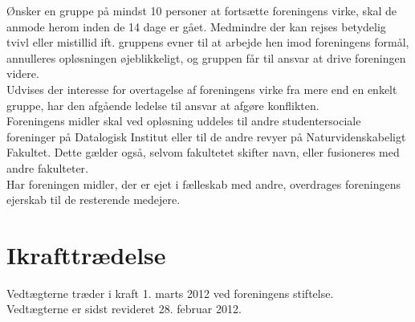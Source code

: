 \documentclass[a4paper,11pt,danish]{article}
\begin{document}
\noindent Ønsker en gruppe på mindst 10 personer at fortsætte foreningens virke, skal de anmode herom inden de 14 dage er gået. Medmindre der kan rejses betydelig tvivl eller mistillid ift. gruppens evner til at arbejde hen imod foreningens formål, annulleres opløsningen øjeblikkeligt, og gruppen får til ansvar at drive foreningen videre.\\

\noindent Udvises der interesse for overtagelse af foreningens virke fra mere end en enkelt gruppe, har den afgående ledelse til ansvar at afgøre konflikten.\\

\noindent Foreningens midler skal ved opløsning uddeles til andre studentersociale foreninger på Datalogisk Institut eller til de andre revyer på Naturvidenskabeligt Fakultet. Dette gælder også, selvom fakultetet skifter navn, eller fusioneres med andre fakulteter. \\

\noindent Har foreningen midler, der er ejet i fælleskab med andre, overdrages foreningens ejerskab til de resterende medejere. 

\section{Ikrafttrædelse}
Vedtægterne træder i kraft 1. marts 2012 ved foreningens stiftelse. \\

\noindent Vedtægterne er sidst revideret 28. februar 2012.
\end{document}
